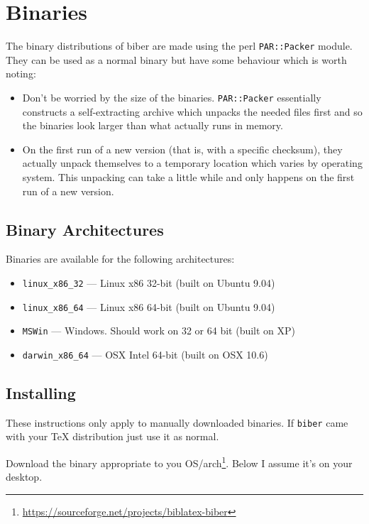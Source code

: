 \documentclass{ltxdockit}
\begin{document}
\section{Binaries}

The binary distributions of biber are made using the perl \verb+PAR::Packer+
module. They can be used as a normal binary but have some behaviour which
is worth noting:

\begin{itemize}
\item Don't be worried by the size of the binaries. \verb+PAR::Packer+ essentially
  constructs a self-extracting archive which unpacks the needed files first
  and so the binaries look larger than what actually runs in memory.
\item On the first run of a new version (that is, with a specific checksum),
  they actually unpack themselves to a temporary location which varies by
  operating system. This unpacking can take a little while and only happens on
  the first run of a new version.
\end{itemize}

\subsection{Binary Architectures}

Binaries are available for the following architectures:

\begin{itemize}
\item \verb+linux_x86_32+ --- Linux x86 32-bit (built on Ubuntu 9.04)
\item \verb+linux_x86_64+ --- Linux x86 64-bit (built on Ubuntu 9.04)
\item \verb+MSWin+ --- Windows. Should work on 32 or 64 bit (built on XP)
\item \verb+darwin_x86_64+ --- OSX Intel 64-bit (built on OSX 10.6)
\end{itemize}


\subsection{Installing}

These instructions only apply to manually downloaded binaries. If
\verb+biber+ came with your TeX distribution just use it as normal.

Download the binary appropriate to you
OS/arch\footnote{\url{https://sourceforge.net/projects/biblatex-biber}}. Below
I assume it's on your desktop.
\end{document}
